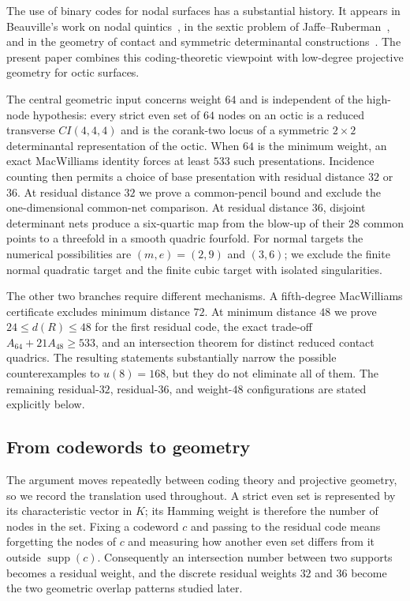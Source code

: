 \documentclass[11pt,reqno]{amsart}
\theoremstyle{remark}
\newcommand{\supp}{\operatorname{supp}}
\begin{document}
The use of binary codes for nodal surfaces has a substantial history.  It appears in Beauville's work on nodal quintics~\cite{BeauvilleMax}, in the sextic problem of Jaffe--Ruberman~\cite{JaffeRuberman}, and in the geometry of contact and symmetric determinantal constructions~\cite{CataneseBabbage,CC,CataneseTonoli}.  The present paper combines this coding-theoretic viewpoint with low-degree projective geometry for octic surfaces.

The central geometric input concerns weight $64$ and is independent of the high-node hypothesis: every strict even set of $64$ nodes on an octic is a reduced transverse $CI(4,4,4)$ and is the corank-two locus of a symmetric $2\times2$ determinantal representation of the octic.  When $64$ is the minimum weight, an exact MacWilliams identity forces at least $533$ such presentations.  Incidence counting then permits a choice of base presentation with residual distance $32$ or $36$.  At residual distance $32$ we prove a common-pencil bound and exclude the one-dimensional common-net comparison.  At residual distance $36$, disjoint determinant nets produce a six-quartic map from the blow-up of their $28$ common points to a threefold in a smooth quadric fourfold.  For normal targets the numerical possibilities are $(m,e)=(2,9)$ and $(3,6)$; we exclude the finite normal quadratic target and the finite cubic target with isolated singularities.

The other two branches require different mechanisms.  A fifth-degree MacWilliams certificate excludes minimum distance $72$.  At minimum distance $48$ we prove $24\le d(R)\le48$ for the first residual code, the exact trade-off $A_{64}+21A_{48}\ge533$, and an intersection theorem for distinct reduced contact quadrics.  The resulting statements substantially narrow the possible counterexamples to $u(8)=168$, but they do not eliminate all of them.  The remaining residual-$32$, residual-$36$, and weight-$48$ configurations are stated explicitly below.

\subsection{From codewords to geometry}
The argument moves repeatedly between coding theory and projective geometry, so we record the translation used throughout.  A strict even set is represented by its characteristic vector in $K$; its Hamming weight is therefore the number of nodes in the set.  Fixing a codeword $c$ and passing to the residual code means forgetting the nodes of $c$ and measuring how another even set differs from it outside $\supp(c)$.  Consequently an intersection number between two supports becomes a residual weight, and the discrete residual weights $32$ and $36$ become the two geometric overlap patterns studied later.
\end{document}
